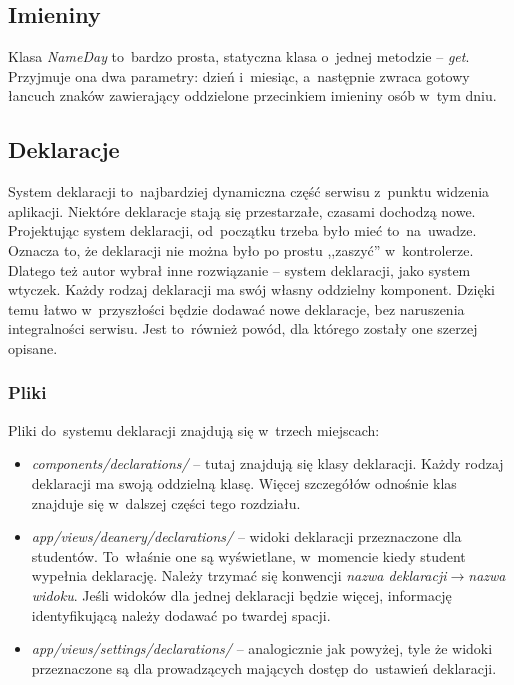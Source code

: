 \documentclass[a4paper,12pt,oneside]{report}
\begin{document}
\subsection{Imieniny}
\label{sub:nameday}
Klasa \emph{NameDay} to~bardzo prosta, statyczna klasa o~jednej metodzie -- \emph{get}. Przyjmuje ona dwa parametry: dzień i~miesiąc, a~następnie zwraca gotowy łancuch znaków zawierający oddzielone przecinkiem imieniny osób w~tym dniu.

\subsection{Deklaracje}
\label{sub:deklaracje}
System deklaracji to~najbardziej dynamiczna część serwisu z~punktu widzenia aplikacji. Niektóre deklaracje stają się przestarzałe, czasami dochodzą nowe. Projektując system deklaracji, od~początku trzeba było mieć to~na~uwadze. Oznacza to, że deklaracji nie można było po prostu ,,zaszyć'' w~kontrolerze. Dlatego też autor wybrał inne rozwiązanie -- system deklaracji, jako system wtyczek. Każdy rodzaj deklaracji ma swój własny oddzielny komponent. Dzięki temu łatwo w~przyszłości będzie dodawać nowe deklaracje, bez naruszenia integralności serwisu. Jest to~również powód, dla którego zostały one szerzej opisane.

\subsubsection{Pliki}
\label{subsub:dec-files}
Pliki do~systemu deklaracji znajdują się w~trzech miejscach:
\begin{itemize}
  \item \emph{components/declarations/} -- tutaj znajdują się klasy deklaracji. Każdy rodzaj deklaracji ma swoją oddzielną klasę. Więcej szczegółów odnośnie klas znajduje się w~dalszej części tego rozdziału.
  \item \emph{app/views/deanery/declarations/} -- widoki deklaracji przeznaczone dla studentów. To~właśnie one są wyświetlane, w~momencie kiedy student wypełnia deklarację. Należy trzymać się konwencji \emph{nazwa deklaracji}$\to$\emph{nazwa widoku}. Jeśli widoków dla jednej deklaracji będzie więcej, informację identyfikującą należy dodawać po twardej spacji.
  \item \emph{app/views/settings/declarations/} -- analogicznie jak powyżej, tyle że widoki przeznaczone są dla prowadzących mających dostęp do~ustawień deklaracji.
\end{itemize}
\end{document}
